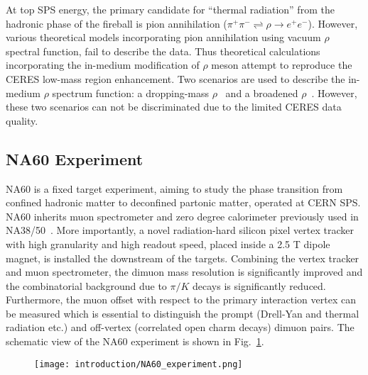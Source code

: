 At top SPS energy, the primary candidate for ``thermal radiation'' from the hadronic phase of the fireball is pion annihilation ($\pi^{+}\pi^{-} \rightleftharpoons \rho \rightarrow e^{+}e^{-}$). However, various theoretical models incorporating pion annihilation using vacuum $\rho$ spectral function, fail to describe the data. Thus theoretical calculations incorporating the in-medium modification of $\rho$ meson attempt to reproduce the CERES low-mass region enhancement. Two scenarios are used to describe the in-medium $\rho$ spectrum function: a dropping-mass $\rho$~\cite{dropmass} and a broadened $\rho$~\cite{broaden0}. However, these two scenarios can not be discriminated due to the limited CERES data quality.

\subsection{NA60 Experiment}
NA60 is a fixed target experiment, aiming to study the phase transition from confined hadronic matter to deconfined partonic matter, operated at CERN SPS. NA60 inherits muon spectrometer and zero degree calorimeter previously used in NA38/50~\cite{NA60:dimuon2}. More importantly, a novel radiation-hard silicon pixel vertex tracker with high granularity and high readout speed, placed inside a 2.5 T dipole magnet, is installed the downstream of the targets. Combining the vertex tracker and muon spectrometer, the dimuon mass resolution is significantly improved and the combinatorial background due to $\pi/K$ decays is significantly reduced. Furthermore, the muon offset with respect to the primary interaction vertex can be measured which is essential to distinguish the prompt (Drell-Yan and thermal radiation etc.) and off-vertex (correlated open charm decays) dimuon pairs. The schematic view of the NA60 experiment is shown in Fig.~\ref{NA60experiment}.

\begin{figure}[htbp]
\centering
\texttt{[image: introduction/NA60\_experiment.png]}
 \label{NA60experiment}
\end{figure}

